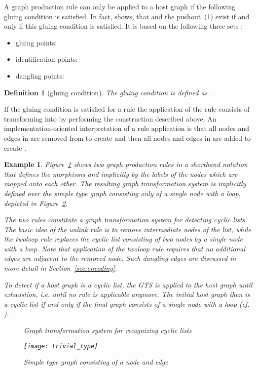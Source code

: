 \documentclass{tlp}
\newtheorem{example}{Example}[section]
\newtheorem{definition}{Definition}[section]
\begin{document}
A graph production rule  can only be applied to a host graph  if the
following gluing condition is satisfied. In fact, \cite{ehrigprangetaentzer06}
shows, that  and the pushout~(1) exist if and only if this gluing condition is
satisfied. It is based on the following three sets \cite{ehrigprangetaentzer06}:

\begin{itemize}
  \item gluing points: 
  \item identification points: 
  \item dangling points: 
\end{itemize}

\begin{definition}[gluing condition]
The \emph{gluing condition} is defined as .
\end{definition}

If the gluing condition is satisfied for a rule  the application of
the rule consists of transforming  into  by performing the construction
described above. An implementation-oriented interpretation of a rule application
is that all nodes and edges in  are removed from  to
create  and then all nodes and edges in  are added to create .

\begin{example}\label{ex:gts}
Figure~\ref{fig:cyclic_grs} shows two graph production rules in a shorthand
notation that defines the morphisms  and  implicitly by the labels of the
nodes which are mapped onto each other. The resulting graph transformation system
is implicitly defined over the simple type graph consisting only of a single node
with a loop, depicted in Figure~\ref{fig:trivial_type}.

The two rules constitute a graph transformation system for detecting cyclic
lists. The basic idea of the \emph{unlink} rule is to remove intermediate nodes
of the list, while the \emph{twoloop} rule replaces the cyclic list consisting of
two nodes by a single node with a loop. Note that application of the
\emph{twoloop} rule requires that no additional edges are adjacent to the removed
node. Such \emph{dangling edges} are discussed in more detail in
Section~\ref{sec:encoding}.

To detect if a host graph is a cyclic list, the GTS is applied to the host graph
until exhaustion, i.e. until no rule is applicable anymore. The initial host
graph then is a cyclic list if and only if the final graph consists of a single
node with a loop (cf. \cite{bakewellplumprunciman03}).

\begin{figure}
\centerline{
}
\caption{Graph transformation system for recognizing cyclic lists}
\label{fig:cyclic_grs}
\end{figure}

\begin{figure}
\texttt{[image: trivial\_type]} 
\caption{Simple type graph consisting of a node and edge}
\label{fig:trivial_type}
\end{figure}
\end{example}
\end{document}
